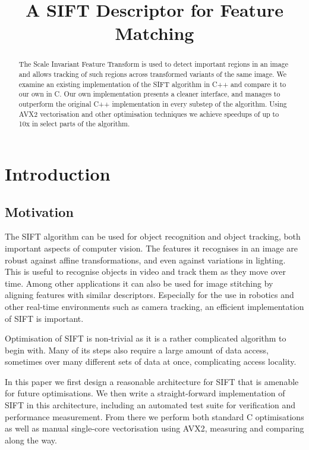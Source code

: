 \documentclass[letterpaper]{article}
\title{A SIFT Descriptor for Feature Matching}
\begin{document}
\maketitle

\begin{abstract}
The Scale Invariant Feature Transform is used to detect important regions in an image and allows tracking of such regions across transformed variants of the same image. We examine an existing implementation of the SIFT algorithm in C++ and compare it to our own in C. Our own implementation presents a cleaner interface, and manages to outperform the original C++ implementation in every substep of the algorithm. Using AVX2 vectorisation and other optimisation techniques we achieve speedups of up to 10x in select parts of the algorithm.
\end{abstract}

\section{Introduction}\label{sec:intro}
\subsection*{Motivation}
The SIFT algorithm can be used for object recognition and object tracking, both important aspects of computer vision. The features it recognises in an image are robust against affine transformations, and even against variations in lighting. This is useful to recognise objects in video and track them as they move over time. Among other applications it can also be used for image stitching by aligning features with similar descriptors. Especially for the use in robotics and other real-time environments such as camera tracking, an efficient implementation of SIFT is important.

Optimisation of SIFT is non-trivial as it is a rather complicated algorithm to begin with. Many of its steps also require a large amount of data access, sometimes over many different sets of data at once, complicating access locality.

In this paper we first design a reasonable architecture for SIFT that is amenable for future optimisations. We then write a straight-forward implementation of SIFT in this architecture, including an automated test suite for verification and performance measurement. From there we perform both standard C optimisations as well as manual single-core vectorisation using AVX2, measuring and comparing along the way.
\end{document}
